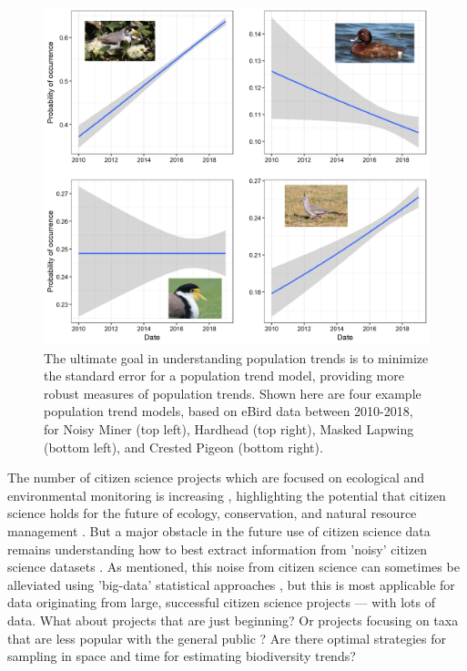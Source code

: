 \documentclass[9pt,twocolumn,twoside,lineno]{pnas-new}
\begin{document}
\begin{figure}[!hb]
\centering
\includegraphics[width=.8\linewidth]{glm_examples_edited.png}
\caption{The ultimate goal in understanding population trends is to minimize the standard error for a population trend model, providing more robust measures of population trends. Shown here are four example population trend models, based on eBird data between 2010-2018, for Noisy Miner (top left), Hardhead (top right), Masked Lapwing (bottom left), and Crested Pigeon (bottom right).}
\label{fig1}
\end{figure}

The number of citizen science projects which are focused on ecological and environmental monitoring is increasing \cite{pocock2017diversity, theobald2015global}, highlighting the potential that citizen science holds for the future of ecology, conservation, and natural resource management \cite{pocock2018vision, silvertown2009new, soroye2018opportunistic, mckinley2017citizen}. But a major obstacle in the future use of citizen science data remains understanding how to best extract information from 'noisy' citizen science datasets \cite{parrish2018exposing}. As mentioned, this noise from citizen science \cite{bird2014statistical} can sometimes be alleviated using 'big-data' statistical approaches \cite{kelling2015taking}, but this is most applicable for data originating from large, successful citizen science projects --- with lots of data. What about projects that are just beginning? Or projects focusing on taxa that are less popular with the general public \cite{mair2016explaining, ward2014understanding}? Are there optimal strategies for sampling in space and time for estimating biodiversity trends?
\end{document}
